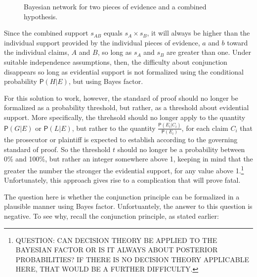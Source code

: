 \documentclass[10pt,dvipsnames,enabledeprecatedfontcommands]{scrartcl}
\newcommand{\pr}[1]{\mathsf{P}(#1)}
\begin{document}
\begin{center}
\begin{figure}[h!]
\caption{Bayesian network for two pieces of evidence and a combined hypothesis.}
\label{network-conjunction}
\end{figure}
\end{center}

Since the combined support \(s_{AB}\) equals \(s_{A}\times s_{B}\), it
will always be higher than the individual support provided by the
individual pieces of evidence, \(a\) and \(b\) toward the individual
claims, \(A\) and \(B\), so long as \(s_{A}\) and \(s_{B}\) are greater
than one. Under suitable independence assumptions, then, the difficulty
about conjunction disappears so long as evidential support is not
formalized using the conditional probability \(\pr{H | E}\), but using
Bayes factor.

For this solution to work, however, the standard of proof should no
longer be formalized as a probability threshold, but rather, as a
threshold about evidential support. More specifically, the threhsold
should no longer apply to the quantity \(\pr{G | E}\) or \(\pr{L | E}\),
but rather to the quantity \(\frac{\pr{E_i | C_i}}{\pr{E_i}}\), for each
claim \(C_i\) that the prosecutor or plaintiff is expected to establish
according to the governing standard of proof. So the threshold \(t\)
should no longer be a probability between 0\% and 100\%, but rather an
integer somewhere above 1, keeping in mind that the greater the number
the stronger the evidential support, for any value above
1.\footnote{QUESTION: CAN DECISION THEORY BE APPLIED TO THE BAYESIAN FACTOR OR IS IT ALWAYS ABOUT POSTERIOR PROBABILITIES? IF THERE IS NO DECISION THEORY APPLICABLE HERE, THAT WOULD BE A FURTHER DIFFICULTY.}
Unfortunately, this approach gives rise to a complication that will
prove fatal.

The question here is whether the conjunction principle can be formalized
in a plausible manner using Bayes factor. Unfortuantely, the answer to
this question is negative. To see why, recall the conjunction principle,
as stated earlier:
\end{document}

